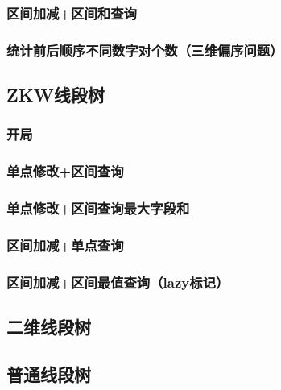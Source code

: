 \documentclass{article}
\begin{document}
\subsubsection{区间加减+区间和查询}

\subsubsection{统计前后顺序不同数字对个数（三维偏序问题）}


\subsection{ZKW线段树}
\subsubsection{开局}

\subsubsection{单点修改+区间查询}

\subsubsection{单点修改+区间查询最大字段和}

\subsubsection{区间加减+单点查询}

\subsubsection{区间加减+区间最值查询（lazy标记）}


\subsection{二维线段树}


\subsection{普通线段树}
\end{document}
